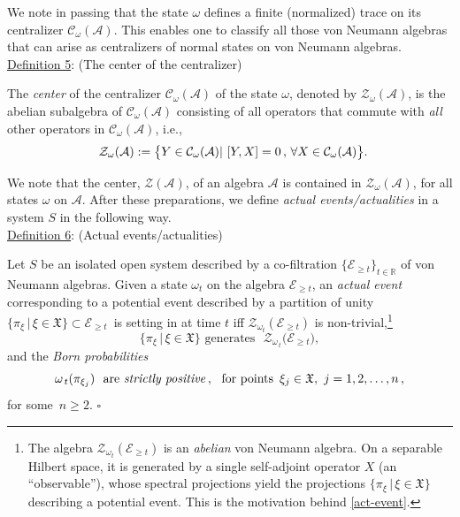 \documentclass[a4paper,11pt]{article}
\begin{document}
We note in passing that the state $\omega$ defines a finite (normalized) trace on its centralizer 
$\mathcal{C}_{\omega}(\mathcal{A})$. This enables one to classify all those von Neumann algebras that can arise as 
centralizers of normal states on von Neumann algebras.\\

\underline{Definition 5}: (The center of the centralizer)

The \textit{center} of the centralizer $\mathcal{C}_{\omega}(\mathcal{A})$ of the state $\omega$, denoted by 
$\mathcal{Z}_{\omega}(\mathcal{A})$, is the abelian subalgebra of $\mathcal{C}_{\omega}(\mathcal{A})$ consisting
of all operators that commute with \textit{all} other operators in 
$\mathcal{C}_{\omega}(\mathcal{A})$, i.e.,
$$
\hspace{2.5cm}\mathcal{Z}_{\omega}(\mathcal{A}):= \big\{ Y \in \mathcal{C}_{\omega}(\mathcal{A})| \,\,[Y,X]=0\,,\, \forall X \in 
\mathcal{C}_{\omega}(\mathcal{A}) \big\}. \hspace{2.3cm} \square
$$

 We note that the center, $\mathcal{Z}(\mathcal{A})$, of an algebra $\mathcal{A}$ is contained in 
 $\mathcal{Z}_{\omega}(\mathcal{A})$, for all states $\omega$ on $\mathcal{A}$. After these preparations, 
 we define \textit{actual events/actualities} in a system $S$ in the following way.\\
 
 \underline{Definition 6}: (Actual events/actualities) \label{ETHevent}
 
Let $S$ be an isolated open system described by a co-filtration $\big\{ \mathcal{E}_{\geq t} \big\}_{t \in \mathbb{R}}$ of von 
Neumann algebras. Given a state $\omega_t$ on the algebra $\mathcal{E}_{\geq t}$, an \textit{actual event} corresponding 
to a potential event described  by a partition of unity 
$\big\{ \pi_{\xi}\,\vert\, \xi \in \mathfrak{X} \big\} \subset \mathcal{E}_{\geq t}$\, is setting in
 at time $t$ iff $\mathcal{Z}_{\omega_t}(\mathcal{E}_{\geq t})$ is non-trivial,\footnote{The 
 algebra $\mathcal{Z}_{\omega_{t}}(\mathcal{E}_{\geq t})$ is an \textit{abelian} von Neumann algebra.
On a separable Hilbert space, it is generated by a single self-adjoint operator $X$ (an ``observable''), 
whose spectral projections yield the projections $\lbrace \pi_{\xi}\,\vert \, \xi \in \mathfrak{X} \rbrace$
describing a potential event. This is the motivation behind \eqref{act-event}.}
\begin{equation}\label{act-event}
\big\{ \pi_{\xi}\,\vert \,\xi \in \mathfrak{X} \big\} \,\,\text{generates   }\,\, \mathcal{Z}_{\omega_{\,t}}\big(\mathcal{E}_{\geq t}\big),
\end{equation}
and the \textit{Born probabilities}
\begin{equation}\label{Born}
\omega_{\,t}(\pi_{\xi_{j}}) \,\,\text{ are \textit{strictly positive}}\,, \,\, \text{ for points }\,\xi_j \in \mathfrak{X}, \,\, j=1,2, \dots, n\,, 
\end{equation}
for some~$n\geq 2$. \hspace{12cm}$\square$
\end{document}
